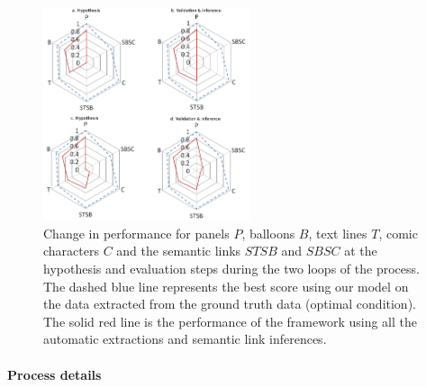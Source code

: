 

\begin{figure}[ht]  %
  \centering
 \includegraphics[width=230px]{radar_chart.png}
 \caption[Knowledge-driven extraction performance evolution]{Change in performance for panels $P$, balloons $B$, text lines $T$, comic characters $C$ and the semantic links $STSB$ and $SBSC$ at the hypothesis and evaluation steps during the two loops of the process.
 The dashed blue line represents the best score using our model on the data extracted from the ground truth data (optimal condition).
 The solid red line is the performance of the framework using all the automatic extractions and semantic link inferences.}
 \label{fig:ex:score_evolution}
\end{figure}

\paragraph{Process details} %
\label{par:process_details}

